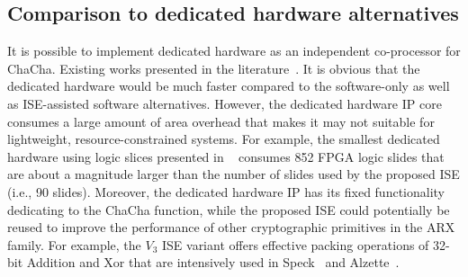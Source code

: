 \subsection{Comparison to dedicated hardware alternatives}
It is possible to implement dedicated hardware as an independent co-processor for ChaCha. 
Existing works presented in the literature~\cite{KLA:19,PRH:19}.
It is obvious that the dedicated hardware would be much faster compared to the software-only as well as ISE-assisted software alternatives.
However, the dedicated hardware IP core consumes a large amount of area overhead 
that makes it may not suitable for lightweight, resource-constrained systems.
For example, the smallest dedicated hardware using logic slices presented in ~\cite{PRH:19} consumes 852 FPGA logic slides that are about a magnitude larger than the number of slides used by the proposed ISE (i.e., 90 slides).
Moreover, the dedicated hardware IP has its fixed functionality dedicating to the ChaCha function, 
while the proposed ISE could potentially be reused 
to improve the performance of other cryptographic primitives in the ARX family.   
For example, the $V_3$ ISE variant offers effective packing operations of 32-bit Addition and Xor 
that are intensively used in Speck~\cite{BSSTWW:13} and Alzette~\cite{BBC:20}.  


